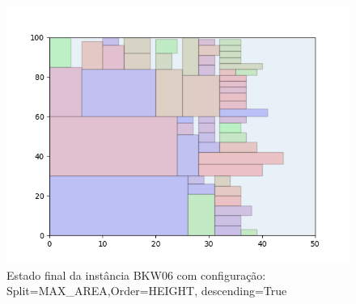 \begin{figure}[H]
    \centering
    \caption[]{Estado final da instância BKW06 com configuração: Split=MAX_AREA,Order=HEIGHT, descending=True}
    \label{fig:bkw06-max_area-height-true}
    \includegraphics[scale=0.5]{output/figures/bkw/bkw06/max_area/height/true/00}
\end{figure}